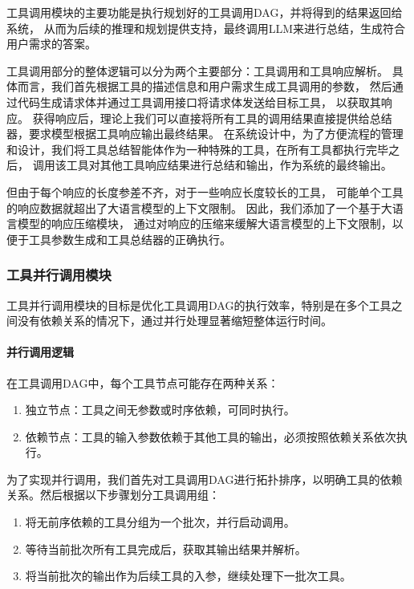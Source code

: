 工具调用模块的主要功能是执行规划好的工具调用DAG，并将得到的结果返回给系统，
从而为后续的推理和规划提供支持，最终调用LLM来进行总结，生成符合用户需求的答案。

工具调用部分的整体逻辑可以分为两个主要部分：工具调用和工具响应解析。
具体而言，我们首先根据工具的描述信息和用户需求生成工具调用的参数，
然后通过代码生成请求体并通过工具调用接口将请求体发送给目标工具，
以获取其响应。
获得响应后，理论上我们可以直接将所有工具的调用结果直接提供给总结器，要求模型根据工具响应输出最终结果。
在系统设计中，为了方便流程的管理和设计，我们将工具总结智能体作为一种特殊的工具，在所有工具都执行完毕之后，
调用该工具对其他工具响应结果进行总结和输出，作为系统的最终输出。

但由于每个响应的长度参差不齐，对于一些响应长度较长的工具，
可能单个工具的响应数据就超出了大语言模型的上下文限制。
因此，我们添加了一个基于大语言模型的响应压缩模块，
通过对响应的压缩来缓解大语言模型的上下文限制，以便于工具参数生成和工具总结器的正确执行。

\subsubsection{工具并行调用模块}

工具并行调用模块的目标是优化工具调用DAG的执行效率，特别是在多个工具之间没有依赖关系的情况下，通过并行处理显著缩短整体运行时间。

\paragraph{并行调用逻辑}

在工具调用DAG中，每个工具节点可能存在两种关系：
\begin{enumerate}
    \item 独立节点：工具之间无参数或时序依赖，可同时执行。
    \item 依赖节点：工具的输入参数依赖于其他工具的输出，必须按照依赖关系依次执行。
\end{enumerate}

为了实现并行调用，我们首先对工具调用DAG进行拓扑排序，以明确工具的依赖关系。然后根据以下步骤划分工具调用组：
\begin{enumerate}
    \item 将无前序依赖的工具分组为一个批次，并行启动调用。
    \item 等待当前批次所有工具完成后，获取其输出结果并解析。
    \item 将当前批次的输出作为后续工具的入参，继续处理下一批次工具。
\end{enumerate}

